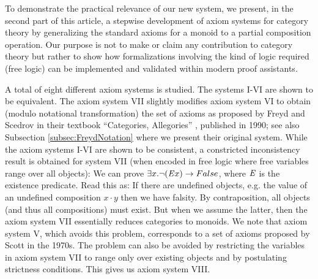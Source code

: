   
To demonstrate the practical relevance of our new system, we present,
in the second part of this article, a stepwise development of axiom
systems for category theory by generalizing the standard axioms for a
monoid to a partial composition operation. Our purpose is not to make
or claim any contribution to category theory but rather to show how
formalizations involving the kind of logic required (free logic) can
be implemented and validated within modern proof assistants.

A total of eight different axiom systems is studied. The systems I-VI
are shown to be equivalent. The axiom system VII slightly modifies
axiom system VI to obtain (modulo notational transformation) the set
of axioms as proposed by Freyd and Scedrov in their textbook
``Categories, Allegories'' \cite{FreydScedrov90}, published in 1990;
see also Subsection \ref{subsec:FreydNotation} where we present their
original system.  While the axiom systems I-VI are shown to be
consistent, a constricted inconsistency result is obtained for system
VII (when encoded in free logic where free variables range over all
objects): We can prove $\exists x. \neg(\mathit{E} x) \rightarrow False$, where
$\mathit{E}$ is the existence predicate. Read this as: If there are undefined
objects, e.g. the value of an undefined composition $x\cdot y$
then we have falsity.  By contraposition, all objects (and thus all
compositions) must exist. But when we assume the latter, then the
axiom system VII essentially reduces categories to monoids.  We note
that axiom system V, which avoids this problem, corresponds to a set
of axioms proposed by Scott \cite{Scott79} in the 1970s. The
problem can also be avoided by restricting the variables in axiom
system VII to range only over existing objects and by postulating
strictness conditions.  This gives us axiom system VIII.

